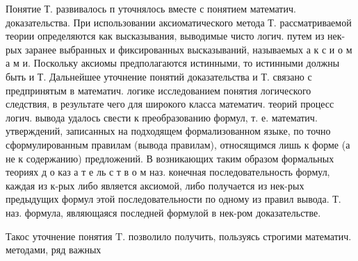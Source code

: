 \documentclass[10pt]{article}
\begin{document}
Понятие Т. развивалось п уточнялось вместе с понятием математич. доказательства. При использовании аксиоматического метода Т. рассматриваемой теории определяются как высказывания, выводимые чисто логич. путем из нек-рых заранее выбранных и фиксированных высказываний, называемых а к с и о м а м и. Поскольку аксиомы предполагаются истинными, то истинными должны быть и Т. Дальнейшее уточнение понятий доказательства и Т. связано с предпринятым в математич. логике исследованием понятия логического следствия, в результате чего для широкого класса математич. теорий процесс логич. вывода удалось свести к преобразованию формул, т. е. математич. утверждений, записанных на подходящем формализованном языке, по точно сформулированным правилам (вывода правилам), относящимся лишь к форме (а не к содержанию) предложений. В возникающих таким образом формальных теориях д о каз а т е ль с т в о м наз. конечная последовательность формул, каждая из к-рых либо является аксиомой, либо получается из нек-рых предыдущих формул этой последовательности по одному из правил вывода. Т. наз. формула, являющаяся последней формулой в нек-ром доказательстве.



Такос уточнение понятия $\mathrm{T}$. позволило получить, пользуясь строгими математич. методами, ряд важных
\end{document}
